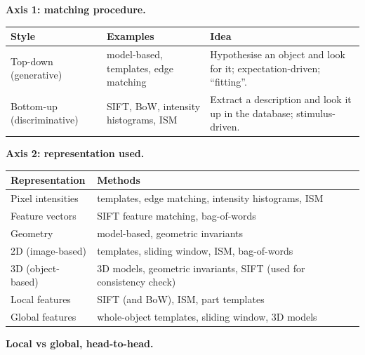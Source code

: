 \textbf{Axis 1: matching procedure.}

\begin{center}
\renewcommand{\arraystretch}{1.3}
\begin{tabular}{@{} l l p{6cm} @{}}
\toprule
\textbf{Style} & \textbf{Examples} & \textbf{Idea} \\
\midrule
Top-down (generative) & model-based, templates, edge matching & Hypothesise an object and look for it; expectation-driven; ``fitting''. \\
Bottom-up (discriminative) & SIFT, BoW, intensity histograms, ISM & Extract a description and look it up in the database; stimulus-driven. \\
\bottomrule
\end{tabular}
\end{center}

\textbf{Axis 2: representation used.}

\begin{center}
\renewcommand{\arraystretch}{1.3}
\begin{tabular}{@{} l l @{}}
\toprule
\textbf{Representation} & \textbf{Methods} \\
\midrule
Pixel intensities & templates, edge matching, intensity histograms, ISM \\
Feature vectors & SIFT feature matching, bag-of-words \\
Geometry & model-based, geometric invariants \\
\midrule
2D (image-based) & templates, sliding window, ISM, bag-of-words \\
3D (object-based) & 3D models, geometric invariants, SIFT (used for consistency check) \\
\midrule
Local features & SIFT (and BoW), ISM, part templates \\
Global features & whole-object templates, sliding window, 3D models \\
\bottomrule
\end{tabular}
\end{center}

\separator

\textbf{Local vs global, head-to-head.}

